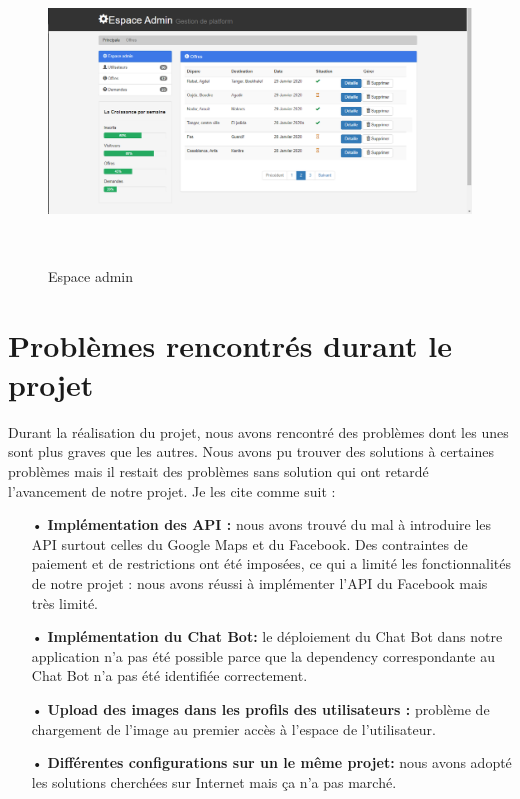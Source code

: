 \documentclass[a4paper]{report}
\begin{document}
\begin{spacing}{2}
\begin{figure}[!ht]
\begin{center}
\includegraphics[height=8cm]{admin_offres.png}
\end{center}
\caption[Espace admin]{Espace admin}
\end{figure}

\cleardoublepage

\section{Problèmes rencontrés durant le projet}
\begin{spacing}{2}
\par 
Durant la réalisation du projet, nous avons rencontré des problèmes dont les unes sont plus graves que les autres. Nous avons pu trouver des solutions à certaines problèmes mais il restait des problèmes sans solution qui ont retardé l'avancement de notre projet. Je les cite comme suit :
\begin{itemize}
\item[•] \textbf{Implémentation des API :} nous avons trouvé du mal à introduire les API surtout celles du Google Maps et du Facebook. Des contraintes de paiement et de restrictions ont été imposées, ce qui a limité les fonctionnalités de notre projet : nous avons réussi à implémenter l'API du Facebook mais très limité. 
\item[•] \textbf{Implémentation du Chat Bot:} le déploiement du Chat Bot dans notre application n'a pas été possible parce que la dependency correspondante au Chat Bot n'a pas été identifiée correctement.
\item[•] \textbf{Upload des images dans les profils des utilisateurs :} problème de chargement de l'image au premier accès à l'espace de l'utilisateur.
\item[•] \textbf{Différentes configurations sur un le même projet:} nous avons adopté les solutions cherchées sur Internet mais ça n'a pas marché. 
\end{itemize} 


\end{spacing}
\end{spacing}
\end{document}
